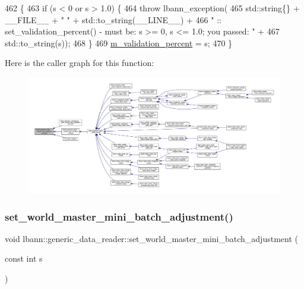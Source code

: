 \begin{DoxyCode}
462                                                          \{
463   \textcolor{keywordflow}{if} (s < 0 or s > 1.0) \{
464     \textcolor{keywordflow}{throw} lbann\_exception(
465       std::string\{\} + \_\_FILE\_\_ + \textcolor{stringliteral}{" "} + std::to\_string(\_\_LINE\_\_) +
466       \textcolor{stringliteral}{" :: set\_validation\_percent() - must be: s >= 0, s <= 1.0; you passed: "} +
467       std::to\_string(s));
468   \}
469   \hyperlink{classlbann_1_1generic__data__reader_a3e4afbe28634a913f6de9daabf05dc0d}{m\_validation\_percent} = s;
470 \}
\end{DoxyCode}
Here is the caller graph for this function\+:\nopagebreak
\begin{figure}[H]
\begin{center}
\leavevmode
\includegraphics[width=350pt]{classlbann_1_1generic__data__reader_a18b67bfa426eb4d2c8195d115c4df49f_icgraph}
\end{center}
\end{figure}
\mbox{\label{classlbann_1_1generic__data__reader_a208cebb68cf3c1ae1bd9cb5f28e8bf5b}} 
\subsubsection{\texorpdfstring{set\+\_\+world\+\_\+master\+\_\+mini\+\_\+batch\+\_\+adjustment()}{set\_world\_master\_mini\_batch\_adjustment()}}
{\footnotesize\ttfamily void lbann\+::generic\+\_\+data\+\_\+reader\+::set\+\_\+world\+\_\+master\+\_\+mini\+\_\+batch\+\_\+adjustment (\begin{DoxyParamCaption}\item[{const int}]{s }\end{DoxyParamCaption})\hspace{0.3cm}{\ttfamily [inline]}}



